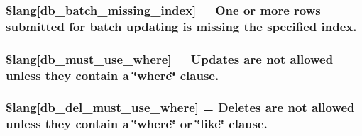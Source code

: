 \subsubsection[{\$lang}]{\setlength{\rightskip}{0pt plus 5cm}\$lang\mbox{[}\textquotesingle{}db\+\_\+batch\+\_\+missing\+\_\+index\textquotesingle{}\mbox{]} = \textquotesingle{}One or more rows submitted {\bf for} batch updating is missing the specified index.\textquotesingle{}}\label{_admin_2system_2language_2english_2db__lang_8php_af946769a3dd5679c60e6f2ef5f7a5aa1}
\hypertarget{_admin_2system_2language_2english_2db__lang_8php_add4bfc65af76fda2c48fa6a2e8d2e506}{}
\subsubsection[{\$lang}]{\setlength{\rightskip}{0pt plus 5cm}\$lang\mbox{[}\textquotesingle{}db\+\_\+must\+\_\+use\+\_\+where\textquotesingle{}\mbox{]} = \textquotesingle{}Updates are not allowed unless they contain {\bf a} \char`\"{}where\char`\"{} clause.\textquotesingle{}}\label{_admin_2system_2language_2english_2db__lang_8php_add4bfc65af76fda2c48fa6a2e8d2e506}
\hypertarget{_admin_2system_2language_2english_2db__lang_8php_a256ae2de791e589ddc23012f74f390ea}{}
\subsubsection[{\$lang}]{\setlength{\rightskip}{0pt plus 5cm}\$lang\mbox{[}\textquotesingle{}db\+\_\+del\+\_\+must\+\_\+use\+\_\+where\textquotesingle{}\mbox{]} = \textquotesingle{}Deletes are not allowed unless they contain {\bf a} \char`\"{}where\char`\"{} or \char`\"{}like\char`\"{} clause.\textquotesingle{}}\label{_admin_2system_2language_2english_2db__lang_8php_a256ae2de791e589ddc23012f74f390ea}
\hypertarget{_admin_2system_2language_2english_2db__lang_8php_a9101352a8cd8c8f34a6b8b1e30c45d8a}{}
